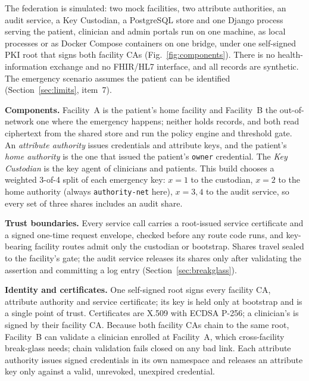 The federation is simulated: two mock facilities, two attribute authorities,
an audit service, a Key Custodian, a PostgreSQL store and one Django process
serving the patient, clinician and admin portals run on one machine, as local
processes or as Docker Compose containers on one bridge, under one
self-signed PKI root that signs both facility CAs
(Fig.~\ref{fig:components}). %
There is no health-information exchange and no FHIR/HL7 interface, and all records are
synthetic. %
The emergency scenario assumes the patient can be identified
(Section~\ref{sec:limits}, item~7). %

\textbf{Components.} Facility~A is the patient's home facility and Facility~B
the out-of-network one where the emergency happens; neither holds records, and
both read ciphertext from the shared store and run the policy engine and
threshold gate. %
An \emph{attribute authority} issues credentials and attribute keys, and the
patient's \emph{home authority} is the one that issued the patient's
\texttt{owner} credential. %
The \emph{Key Custodian} is the key agent of clinicians and patients.
This build chooses a weighted 3-of-4 split of each emergency key: $x{=}1$ to the custodian, $x{=}2$ to the home authority
(always \texttt{authority-net} here), $x{=}3,4$ to
the audit service, so every set of three shares includes an audit
share. %

\textbf{Trust boundaries.} Every service call carries a root-issued service
certificate and a signed one-time request envelope, checked before any route
code runs, and key-bearing facility routes admit only the custodian or
bootstrap. %
Shares travel sealed to the facility's gate; the audit service releases its
shares only after validating the assertion and committing a log entry
(Section~\ref{sec:breakglass}). %

\textbf{Identity and certificates.} One self-signed root signs every facility
CA, attribute authority and service certificate; its key is held only at
bootstrap and is a single point of trust. %
Certificates are X.509 with ECDSA P-256; a clinician's is signed by their
facility CA. %
Because both facility CAs chain to the same root, Facility~B can validate a
clinician enrolled at Facility~A, which cross-facility break-glass needs;
chain validation fails closed on any bad link. %
Each attribute authority issues signed credentials in its own namespace and
releases an attribute key only against a valid, unrevoked, unexpired
credential. %

